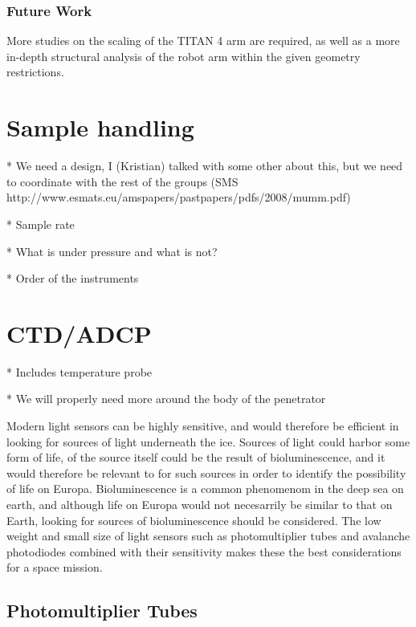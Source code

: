 \subsubsection{Future Work}
More studies on the scaling of the TITAN 4 arm are required, as well as a more in-depth structural analysis of the robot arm within the given geometry restrictions.  

\section{Sample handling}

* We need a design, I (Kristian) talked with some other about this, but we need to coordinate with the rest of the groups
   (SMS http://www.esmats.eu/amspapers/pastpapers/pdfs/2008/mumm.pdf)

* Sample rate

* What is under pressure and what is not?

* Order of the instruments



\section{CTD/ADCP}

* Includes temperature probe

    * We will properly need more around the body of the penetrator


Modern light sensors can be highly sensitive, and would therefore be efficient in looking for sources of light underneath the ice. Sources of light could harbor some form of life, of the source itself could be the result of bioluminescence, and it would therefore be relevant to for such sources in order to identify the possibility of life on Europa. Bioluminescence is a common phenomenom in the deep sea on earth, and although life on Europa would not necesarrily be similar to that on Earth, looking for sources of bioluminescence should be considered. The low weight and small size of light sensors such as photomultiplier tubes and avalanche photodiodes combined with their sensitivity makes these the best considerations for a space mission. 

\subsection{Photomultiplier Tubes}

